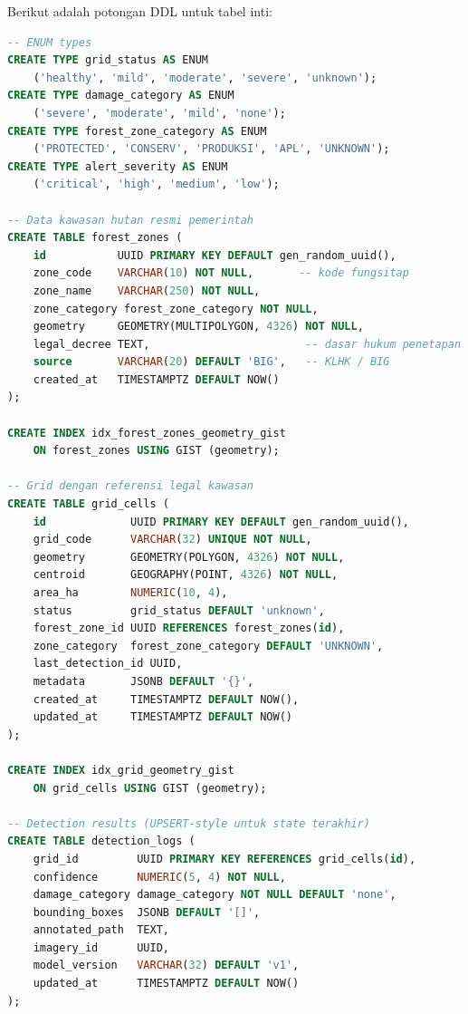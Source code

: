 \documentclass[11pt,a4paper]{article}
\begin{document}
Berikut adalah potongan DDL untuk tabel inti:

\begin{lstlisting}[language=SQL, caption={DDL Tabel forest\_zones, grid\_cells, dan legal-aware trigger}]
-- ENUM types
CREATE TYPE grid_status AS ENUM
    ('healthy', 'mild', 'moderate', 'severe', 'unknown');
CREATE TYPE damage_category AS ENUM
    ('severe', 'moderate', 'mild', 'none');
CREATE TYPE forest_zone_category AS ENUM
    ('PROTECTED', 'CONSERV', 'PRODUKSI', 'APL', 'UNKNOWN');
CREATE TYPE alert_severity AS ENUM
    ('critical', 'high', 'medium', 'low');

-- Data kawasan hutan resmi pemerintah
CREATE TABLE forest_zones (
    id           UUID PRIMARY KEY DEFAULT gen_random_uuid(),
    zone_code    VARCHAR(10) NOT NULL,       -- kode fungsitap
    zone_name    VARCHAR(250) NOT NULL,
    zone_category forest_zone_category NOT NULL,
    geometry     GEOMETRY(MULTIPOLYGON, 4326) NOT NULL,
    legal_decree TEXT,                        -- dasar hukum penetapan
    source       VARCHAR(20) DEFAULT 'BIG',   -- KLHK / BIG
    created_at   TIMESTAMPTZ DEFAULT NOW()
);

CREATE INDEX idx_forest_zones_geometry_gist
    ON forest_zones USING GIST (geometry);

-- Grid dengan referensi legal kawasan
CREATE TABLE grid_cells (
    id             UUID PRIMARY KEY DEFAULT gen_random_uuid(),
    grid_code      VARCHAR(32) UNIQUE NOT NULL,
    geometry       GEOMETRY(POLYGON, 4326) NOT NULL,
    centroid       GEOGRAPHY(POINT, 4326) NOT NULL,
    area_ha        NUMERIC(10, 4),
    status         grid_status DEFAULT 'unknown',
    forest_zone_id UUID REFERENCES forest_zones(id),
    zone_category  forest_zone_category DEFAULT 'UNKNOWN',
    last_detection_id UUID,
    metadata       JSONB DEFAULT '{}',
    created_at     TIMESTAMPTZ DEFAULT NOW(),
    updated_at     TIMESTAMPTZ DEFAULT NOW()
);

CREATE INDEX idx_grid_geometry_gist
    ON grid_cells USING GIST (geometry);

-- Detection results (UPSERT-style untuk state terakhir)
CREATE TABLE detection_logs (
    grid_id         UUID PRIMARY KEY REFERENCES grid_cells(id),
    confidence      NUMERIC(5, 4) NOT NULL,
    damage_category damage_category NOT NULL DEFAULT 'none',
    bounding_boxes  JSONB DEFAULT '[]',
    annotated_path  TEXT,
    imagery_id      UUID,
    model_version   VARCHAR(32) DEFAULT 'v1',
    updated_at      TIMESTAMPTZ DEFAULT NOW()
);


\end{lstlisting}
\end{document}
